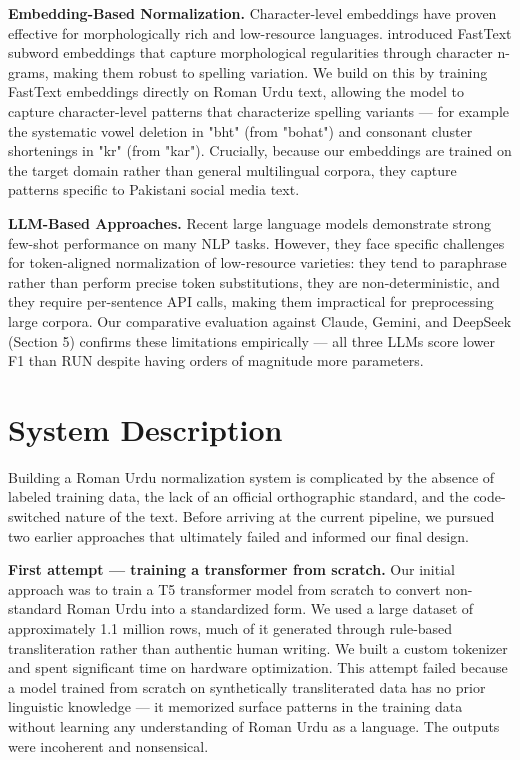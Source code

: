 \documentclass[11pt]{article}
\begin{document}
\textbf{Embedding-Based Normalization.} Character-level embeddings have proven effective for morphologically rich and low-resource languages. \citet{bojanowski2017enriching} introduced FastText subword embeddings that capture morphological regularities through character n-grams, making them robust to spelling variation. We build on this by training FastText embeddings directly on Roman Urdu text, allowing the model to capture character-level patterns that characterize spelling variants — for example the systematic vowel deletion in "bht" (from "bohat") and consonant cluster shortenings in "kr" (from "kar"). Crucially, because our embeddings are trained on the target domain rather than general multilingual corpora, they capture patterns specific to Pakistani social media text.

\textbf{LLM-Based Approaches.} Recent large language models demonstrate strong few-shot performance on many NLP tasks. However, they face specific challenges for token-aligned normalization of low-resource varieties: they tend to paraphrase rather than perform precise token substitutions, they are non-deterministic, and they require per-sentence API calls, making them impractical for preprocessing large corpora. Our comparative evaluation against Claude, Gemini, and DeepSeek (Section 5) confirms these limitations empirically — all three LLMs score lower F1 than RUN despite having orders of magnitude more parameters.


\section{System Description}
Building a Roman Urdu normalization system is complicated by the absence of labeled training data, the lack of an official orthographic standard, and the code-switched nature of the text. Before arriving at the current pipeline, we pursued two earlier approaches that ultimately failed and informed our final design.

\textbf{First attempt — training a transformer from scratch.} Our initial approach was to train a T5 transformer model from scratch to convert non-standard Roman Urdu into a standardized form. We used a large dataset of approximately 1.1 million rows, much of it generated through rule-based transliteration rather than authentic human writing. We built a custom tokenizer and spent significant time on hardware optimization. This attempt failed because a model trained from scratch on synthetically transliterated data has no prior linguistic knowledge — it memorized surface patterns in the training data without learning any understanding of Roman Urdu as a language. The outputs were incoherent and nonsensical.
\end{document}
